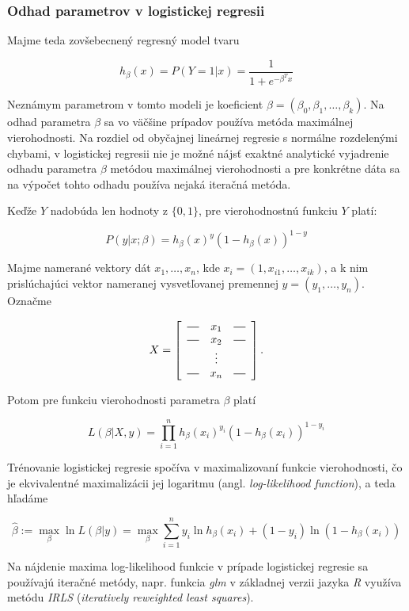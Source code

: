 \subsubsection{Odhad parametrov v logistickej regresii}

Majme teda zovšebecnený regresný model tvaru

\[
h_\beta(x) = P(Y = 1|x) = \frac{1}{1 + e^{-\beta^T x}}
\]

Neznámym parametrom v tomto modeli je koeficient \( \beta = (\beta_0, \beta_1, \ldots, \beta_k) \).
Na odhad parametra \( \beta \) sa vo väčšine prípadov používa metóda maximálnej vierohodnosti.
Na rozdiel od obyčajnej lineárnej regresie s normálne rozdelenými chybami,
v logistickej regresii nie je možné nájsť exaktné analytické vyjadrenie odhadu parametra \( \beta \) metódou maximálnej vierohodnosti
a pre konkrétne dáta sa na výpočet tohto odhadu používa nejaká iteračná metóda.

Keďže \(Y\) nadobúda len hodnoty z \( \{0, 1\} \), pre vierohodnostnú funkciu \(Y\) platí:

\[
P(y | x; \beta ) = h_\beta(x)^y (1 - h_\beta(x))^{1 - y}
\]

Majme namerané vektory dát \( x_1, \ldots, x_n \), kde \( x_i = (1, x_{i1}, \ldots, x_{ik}) \),
a k nim prislúchajúci vektor nameranej vysvetľovanej premennej \(y = (y_1, \ldots, y_n )\). Označme

\[
    X =
    \left[
        \begin{array}{ccc}
            \horzbar & x_{1} & \horzbar \\
            \horzbar & x_{2} & \horzbar \\
                    & \vdots    &          \\
            \horzbar & x_{n} & \horzbar
        \end{array}
    \right].
\]


Potom pre funkciu vierohodnosti parametra \( \beta \) platí

\[
L(\beta | X, y) = \prod_{i = 1}^n h_\beta(x_i)^{y_i} (1 - h_\beta(x_i))^{1 - y_i}
\]

Trénovanie logistickej regresie spočíva v maximalizovaní funkcie vierohodnosti,
čo je ekvivalentné maximalizácii jej logaritmu (angl. \emph{log-likelihood function}), a teda hľadáme

\[
\hat{\beta} := \max_{\beta} \ln L(\beta | y) = \max_{\beta} \sum_{i = 1}^n y_i \ln{h_{\beta}(x_i)} + (1 - y_i) \ln{(1 - h_{\beta}(x_i))}
\]

Na nájdenie maxima log-likelihood funkcie v prípade logistickej regresie sa používajú iteračné metódy,
napr. funkcia \emph{glm} v základnej verzii jazyka \emph{R} využíva metódu \emph{IRLS} (\emph{iteratively reweighted least squares}).

